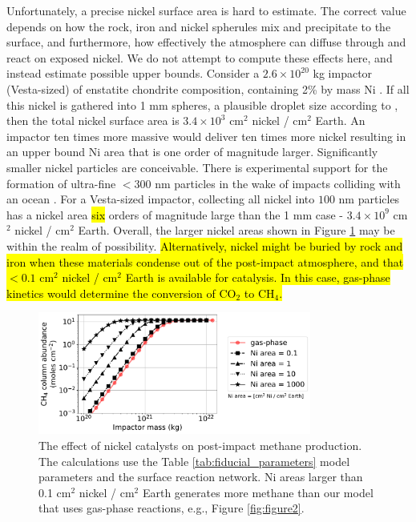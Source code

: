 Unfortunately, a precise nickel surface area is hard to estimate. The correct value depends on how the rock, iron and nickel spherules mix and precipitate to the surface, and furthermore, how effectively the atmosphere can diffuse through and react on exposed nickel. We do not attempt to compute these effects here, and instead estimate possible upper bounds. Consider a $2.6 \times 10^{20}$ kg impactor (Vesta-sized) of enstatite chondrite composition, containing 2\% by mass Ni \citep{Lewis_1992}. If all this nickel is gathered into 1 mm spheres, a plausible droplet size according to \citet{Genda_2017}, then the total nickel surface area is $3.4 \times 10^3$ cm$^2$ nickel / cm$^2$ Earth. An impactor ten times more massive would deliver ten times more nickel resulting in an upper bound Ni area that is one order of magnitude larger. Significantly smaller nickel particles are conceivable. There is experimental support for the formation of ultra-fine $< 300$ nm particles in the wake of impacts colliding with an ocean \citep{Furukawa_2007}. For a Vesta-sized impactor, collecting all nickel into $100$ nm particles has a nickel area \hl{six} orders of magnitude large than the 1 mm case - $3.4 \times 10^{9}$ cm$^2$ nickel / cm$^2$ Earth. Overall, the larger nickel areas shown in Figure \ref{fig:figure3} may be within the realm of possibility. \hl{Alternatively, nickel might be buried by rock and iron when these materials condense out of the post-impact atmosphere, and that $< 0.1$ cm$^2$ nickel / cm$^2$ Earth is available for catalysis. In this case, gas-phase kinetics would determine the conversion of CO$_2$ to CH$_4$.}

\begin{figure}
  \centering
  \includegraphics[width=0.8\textwidth]{tex/5impacts/figures/Figure3.pdf}
  \caption{The effect of nickel catalysts on post-impact methane production. The calculations use the Table \ref{tab:fiducial_parameters} model parameters and the \citet{Schmider_2021} surface reaction network. Ni areas larger than 0.1 cm$^2$ nickel / cm$^2$ Earth generates more methane than our model that uses gas-phase reactions, e.g., Figure \ref{fig:figure2}.}
  \label{fig:figure3}
\end{figure}

